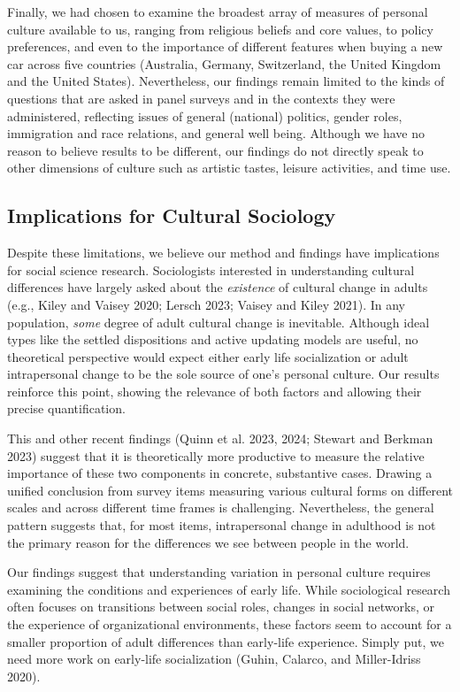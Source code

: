 \documentclass[
  11pt,
]{article}
\begin{document}
Finally, we had chosen to examine the broadest array of measures of
personal culture available to us, ranging from religious beliefs and
core values, to policy preferences, and even to the importance of
different features when buying a new car across five countries
(Australia, Germany, Switzerland, the United Kingdom and the United
States). Nevertheless, our findings remain limited to the kinds of
questions that are asked in panel surveys and in the contexts they were
administered, reflecting issues of general (national) politics, gender
roles, immigration and race relations, and general well being. Although
we have no reason to believe results to be different, our findings do
not directly speak to other dimensions of culture such as artistic
tastes, leisure activities, and time use.

\subsection{Implications for Cultural
Sociology}\label{implications-for-cultural-sociology}

Despite these limitations, we believe our method and findings have
implications for social science research. Sociologists interested in
understanding cultural differences have largely asked about the
\emph{existence} of cultural change in adults (e.g., Kiley and Vaisey
2020; Lersch 2023; Vaisey and Kiley 2021). In any population,
\emph{some} degree of adult cultural change is inevitable. Although
ideal types like the settled dispositions and active updating models are
useful, no theoretical perspective would expect either early life
socialization or adult intrapersonal change to be the sole source of
one's personal culture. Our results reinforce this point, showing the
relevance of both factors and allowing their precise quantification.

This and other recent findings (Quinn et al. 2023, 2024; Stewart and
Berkman 2023) suggest that it is theoretically more productive to
measure the relative importance of these two components in concrete,
substantive cases. Drawing a unified conclusion from survey items
measuring various cultural forms on different scales and across
different time frames is challenging. Nevertheless, the general pattern
suggests that, for most items, intrapersonal change in adulthood is not
the primary reason for the differences we see between people in the
world.

Our findings suggest that understanding variation in personal culture
requires examining the conditions and experiences of early life. While
sociological research often focuses on transitions between social roles,
changes in social networks, or the experience of organizational
environments, these factors seem to account for a smaller proportion of
adult differences than early-life experience. Simply put, we need more
work on early-life socialization (Guhin, Calarco, and Miller-Idriss
2020).
\end{document}
